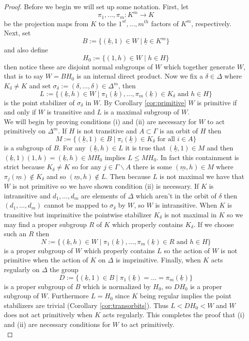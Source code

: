 \documentclass[]{article}
\theoremstyle{definition}
\begin{document}
\begin{proof}
	Before we begin we will set up some notation. First, let $$\pi_1,\dots,\pi_m:K^m \rightarrow K$$ be the projection maps from $K$ to the $1^{st},\dots,m^{th}$ factors of $K^m$, respectively. Next, set
	$$B:=\{(\underline{k},1) \in W \; | \; \underline{k} \in K^m \}$$
	and also define
	$$H_0 := \{(1,h) \in W \; | \; h \in H \}$$
	then notice these are disjoint normal subgroups of $W$ which together generate $W$, that is to say $W=BH_0$ is an internal direct product. Now we fix a $\delta \in \Delta$ where $K_\delta \neq K$ and set $\sigma_\delta:=(\delta,\dots,\delta) \in \Delta^m$, then
	$$L:=\{(\underline{k},h) \in W \; | \; \pi_1(\underline{k}),\dots,\pi_m(\underline{k})\in K_\delta \mbox{ and } h \in H \}$$
	is the point stabilizer of $\sigma_\delta$ in $W$. By Corollary \ref{cor:primitive} $W$ is primitive if and only if $W$ is transitive and $L$ is a maximal subgroup of $W$. \\
	
	
	We will begin by proving conditions (i) and (ii) are necessary for $W$ to act primitively on $\Delta^m$. If $H$ is not transitive and $A \subset \Gamma$ is an orbit of $H$ then
	$$M:=\{(\underline{k},1) \in B \; | \; \pi_i(\underline{k}) \in K_\delta \mbox{ for all } i \in A\} $$
	is a subgroup of $B$. For any $(\underline{k},h) \in L$ it is true that $(\underline{k},1) \in M$ and then $(\underline{k},1)(1,h)=(\underline{k},h) \in MH_0$ implies $L \leqslant MH_0$. In fact this containment is strict because $K_\delta \neq K$ so for any $j \in \Gamma \backslash A$ there is some $(\underline{m},h) \in M$ where $\pi_j(\underline{m}) \notin K_\delta$ and so $(\underline{m},h) \notin L$. Then because $L$ is not maximal we have that $W$ is not primitive so we have shown condition (ii) is necessary. If $K$ is intransitive and $d_1,\dots,d_m$ are elements of $\Delta$ which aren't in the orbit of $\delta$ then $(d_1,\dots, d_m)$ cannot be mapped to $\sigma_\delta$ by $W$, so $W$ is intransitive.
	When $K$ is transitive but imprimitive the pointwise stabilizer $K_\delta$ is not maximal in $K$ so we may find a proper subgroup $R$  of $K$ which properly contains $K_\delta$. If we choose such an $R$ then
	$$N:=\{(\underline{k},h) \in W \; | \; \pi_1(\underline{k}),\dots,\pi_m(\underline{k}) \in R \mbox{ and } h \in H\} $$
	is a proper subgroup of $W$ which properly contains $L$ so the action of $W$ is not primitive when the action of $K$ on $\Delta$ is imprimitive. Finally, when $K$ acts regularly on $\Delta$ the group
	$$D:= \{(\underline{k},1) \in B \; | \; \pi_1(\underline{k})=\dots=\pi_m(\underline{k})\} $$
	is a proper subgroup of $B$ which is normalized by $H_0$, so $DH_0$ is a proper subgroup of $W$. Furthermore $L = H_0$ since $K$ being regular implies the point stabilizers are trivial (Corollary \ref{cor:transorbits}). Thus $L < DH_0 < W$ and $W$ does not act primitively when $K$ acts regularly. This completes the proof that (i) and (ii) are necessary conditions for $W$ to act primitively. \\
	

\end{proof}
\end{document}
